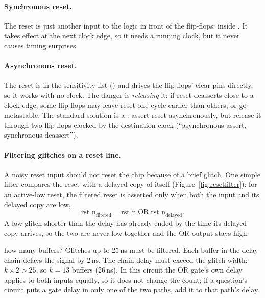 \paragraph{Synchronous reset.} The reset is just another input to the logic in front of the flip-flops:  inside . It takes effect at the next clock edge, so it needs a running clock, but it never causes timing surprises.

\paragraph{Asynchronous reset.} The reset is in the sensitivity list () and drives the flip-flops' clear pins directly, so it works with no clock. The danger is \emph{releasing} it: if reset deasserts close to a clock edge, some flip-flops may leave reset one cycle earlier than others, or go metastable. The standard solution is a : assert reset asynchronously, but release it through two flip-flops clocked by the destination clock (``asynchronous assert, synchronous deassert'').

\paragraph{Filtering glitches on a reset line.} A noisy reset input should not reset the chip because of a brief glitch. One simple filter compares the reset with a delayed copy of itself (Figure~\ref{fig:resetfilter}): for an active-low reset, the filtered reset is asserted only when both the input and its delayed copy are low,
\[
  \text{rst\_n}_{\text{filtered}} = \text{rst\_n} \;\text{OR}\; \text{rst\_n}_{\text{delayed}}.
\]
A low glitch shorter than the delay has already ended by the time its delayed copy arrives, so the two are never low together and the OR output stays high.

\begin{worked}{how many buffers?}
Glitches up to 25\,ns must be filtered. Each buffer in the delay chain delays the signal by 2\,ns. The chain delay must exceed the glitch width: $k \times 2 > 25$, so $k = 13$ buffers (26\,ns). In this circuit the OR gate's own delay applies to both inputs equally, so it does not change the count; if a question's circuit puts a gate delay in only one of the two paths, add it to that path's delay.
\end{worked}

